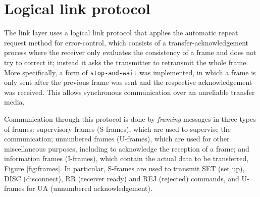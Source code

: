 \documentclass[a4paper, 11pt]{report}
\begin{document}
\section{Logical link protocol} \label{sec:LLProtocol}

The link layer uses a logical link protocol that applies the automatic repeat request method for error-control, which consists of a transfer-acknowledgement process where the receiver only evaluates the consistency of a frame and does not try to correct it; instead it asks the transmitter to retransmit the whole frame. More specifically, a form of \texttt{stop-and-wait} was implemented, in which a frame is only sent after the previous frame was sent and the respective acknowledgement was received. This allows synchronous communication over an unreliable transfer media.

Communication through this protocol is done by \textit{framing} messages in three types of frames: supervisory frames (S-frames), which are used to supervise the communication; unnunbered frames (U-frames), which are used for other miscellaneous purposes, including to acknowledge the reception of a frame; and information frames (I-frames), which contain the actual data to be transferred, Figure \ref{fig:frames}. In particular, S-frames are used to transmit SET (set up), DISC (disconnect), RR (receiver ready) and REJ (rejected) commands, and U-frames for UA (unnumbered acknowledgement).
\end{document}
